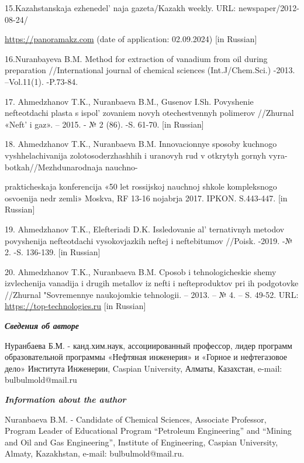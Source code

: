 \begin{references}
15.Kazahstanskaja ezhenedel' naja gazeta/Kazakh weekly.
URL: newspaper/2012-08-24/

\href{https://panoramakz.com/index.php/economics/oil/item/32263-?utm\_source=google.com\&utm\_medium=organic\&utm\_campaign=google.com\&utm\_referrer=google.com}{https://panoramakz.com}
(date of application: 02.09.2024) {[}in Russian{]}

16.Nuranbayeva B.M. Method for extraction of vanadium from oil during
preparation //International journal of chemical sciences
(Int.J/Chem.Sci.) -2013. --Vol.11(1). -P.73-84.

17. Ahmedzhanov T.K., Nuranbaeva B.M., Gusenov I.Sh. Povyshenie
nefteotdachi plasta s ispol' zovaniem novyh
otechestvennyh polimerov //Zhurnal «Neft'{} i gaz». --
2015. - № 2 (86). -S. 61-70. {[}in Russian{]}

18. Ahmedzhanov T.K., Nuranbaeva B.M. Innovacionnye sposoby kuchnogo
vyshhelachivanija \linebreak zolotosoderzhashhih i uranovyh rud v otkrytyh gornyh
vyra-botkah//Mezhdunarodnaja nauchno-

prakticheskaja konferencija «50 let
rossijskoj nauchnoj shkole kompleksnogo osvoenija nedr zemli» Moskva, RF
13-16 nojabrja 2017. IPKON. S.443-447. {[}in Russian{]}

19. Ahmedzhanov T.K., Elefteriadi D.K. Issledovanie
al' ternativnyh metodov povyshenija nefteotdachi
vysokovjazkih neftej i neftebitumov //Poisk. -2019. -№ 2. -S. 136-139.
{[}in Russian{]}

20. Ahmedzhanov T.K., Nuranbaeva B.M. Cposob i tehnologicheskie shemy
izvlechenija vanadija i drugih metallov iz nefti i nefteproduktov pri ih
podgotovke //Zhurnal "Sovremennye naukojomkie tehnologii. -- 2013. -- №
4. -- S. 49-52. URL:
\href{https://top-technologies.ru/ru/article/view?id=31603}{https://top-technologies.ru} {[}in
Russian{]}
\end{references}


\begin{authorinfo}
  \hspace{1em}\emph{{\bfseries Сведения об авторе}}

Нуранбаева Б.М. - канд.хим.наук, ассоциированный профессор, лидер
программ образовательной программы «Нефтяная инженерия» и «Горное и
нефтегазовое дело» Института Инженерии, Caspian University, Алматы,
Казахстан, e-mail: bulbulmold@mail.ru

\hspace{1em}\emph{{\bfseries Information about the author}}

Nuranbaeva B.M. - Candidate of Chemical Sciences, Associate Professor, Program Leader of Educational Program
“Petroleum Engineering” and “Mining and Oil and Gas Engineering”, Institute of Engineering, Caspian University,
Almaty, Kazakhstan, e-mail: bulbulmold@mail.ru.
\end{authorinfo}


